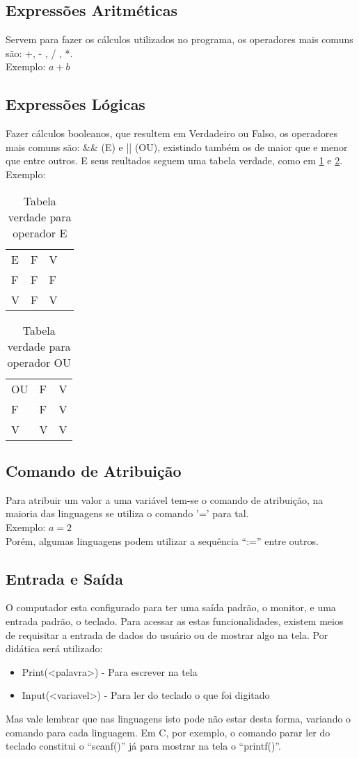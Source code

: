 \subsection{Expressões Aritméticas}
Servem para fazer os cálculos utilizados no programa, os operadores mais comuns são: +, - , / , *.\\ 
Exemplo: $ a + b $
\subsection{Expressões Lógicas}
Fazer cálculos booleanos, que resultem em Verdadeiro ou Falso, os operadores mais comuns são: \&\& (E) e || (OU), existindo também os de maior que e menor que entre outros. E seus reultados seguem uma tabela verdade, como em \ref{tab:vE} e \ref{tab:vOU}.
Exemplo: \\
\begin{table}[!h]
\centering
\caption{Tabela verdade para operador E}
\label{tab:vE}
\begin{tabular}{llll} \hline \hline
E & F & V  \\
F & F & F  \\
V & F & V  \\ \hline \hline
\end{tabular}
\end{table}

\begin{table}[!h]
\centering
\caption{Tabela verdade para operador OU}
\label{tab:vOU}
\begin{tabular}{lll} \hline \hline
OU & F & V \\
F  & F & V \\
V  & V & V \\ \hline \hline
\end{tabular}
\end{table}
\subsection{Comando de Atribuição}
Para atribuir um valor a uma variável tem-se o comando de atribuição, na maioria das linguagens se utiliza o comando '=' para tal. \\
Exemplo: $ a = 2 $ \\
Porém, algumas linguagens podem utilizar a sequência ``:='' entre outros.
\subsection{Entrada e Saída}
O computador esta configurado para ter uma saída padrão, o monitor, e uma entrada padrão, o teclado. Para acessar as estas funcionalidades, existem meios de requisitar a entrada de dados do usuário ou de mostrar algo na tela. Por didática será utilizado:
\begin{itemize}
    \item Print(<palavra>) - Para escrever na tela
    \item Input(<variavel>) - Para ler do teclado o que foi digitado
\end{itemize}
Mas vale lembrar que nas linguagens isto pode não estar desta forma, variando o comando para cada linguagem. Em C, por exemplo, o comando parar ler do teclado constitui o ``scanf()'' já para mostrar na tela o ``printf()''.

